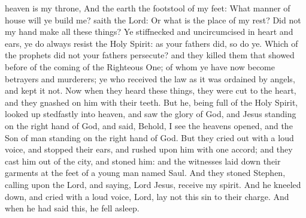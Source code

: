 heaven is my throne, And the earth the footstool of my feet: What manner of house will ye build me? saith the Lord: Or what is the place of my rest?  Did not my hand make all these things?  Ye stiffnecked and uncircumcised in heart and ears, ye do always resist the Holy Spirit: as your fathers did, so do ye. Which of the prophets did not your fathers persecute? and they killed them that showed before of the coming of the Righteous One; of whom ye have now become betrayers and murderers; ye who received the law as it was ordained by angels, and kept it not.  Now when they heard these things, they were cut to the heart, and they gnashed on him with their teeth. But he, being full of the Holy Spirit, looked up stedfastly into heaven, and saw the glory of God, and Jesus standing on the right hand of God, and said, Behold, I see the heavens opened, and the Son of man standing on the right hand of God. But they cried out with a loud voice, and stopped their ears, and rushed upon him with one accord; and they cast him out of the city, and stoned him: and the witnesses laid down their garments at the feet of a young man named Saul. And they stoned Stephen, calling upon the Lord, and saying, Lord Jesus, receive my spirit. And he kneeled down, and cried with a loud voice, Lord, lay not this sin to their charge. And when he had said this, he fell asleep. 


